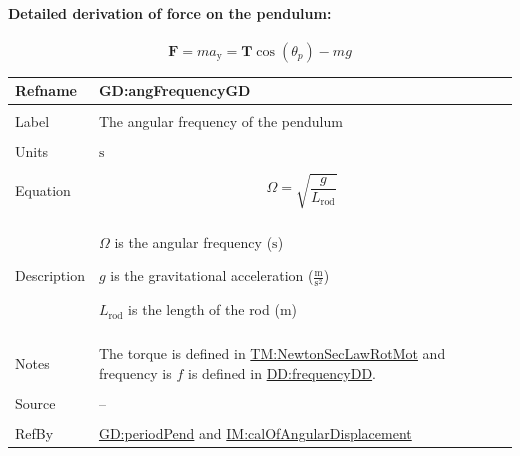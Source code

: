 \documentclass[12pt]{article}
\begin{document}
\paragraph{Detailed derivation of force on the pendulum:}
\label{GD:vForceOnPendulumDeriv}
\begin{displaymath}
\symbf{F}=m {a_{\text{y}}}=\symbf{T} \cos\left({θ_{p}}\right)-m g
\end{displaymath}
\vspace{\baselineskip}
\noindent
\begin{minipage}{\textwidth}
\begin{tabular}{>{\raggedright}p{}>{\raggedright\arraybackslash}p{}}
\toprule \textbf{Refname} & \textbf{GD:angFrequencyGD}
\label{GD:angFrequencyGD}
\\ \midrule \\
Label & The angular frequency of the pendulum
        
\\ \midrule \\
Units & ${\text{s}}$
        
\\ \midrule \\
Equation & \begin{displaymath}
           Ω=\sqrt{\frac{g}{{L_{\text{rod}}}}}
           \end{displaymath}
\\ \midrule \\
Description & \begin{symbDescription}
              \item{$Ω$ is the angular frequency (${\text{s}}$)}
              \item{$g$ is the gravitational acceleration ($\frac{\text{m}}{\text{s}^{2}}$)}
              \item{${L_{\text{rod}}}$ is the length of the rod (${\text{m}}$)}
              \end{symbDescription}
\\ \midrule \\
Notes & The torque is defined in \hyperref[TM:NewtonSecLawRotMot]{TM:NewtonSecLawRotMot} and frequency is $f$ is defined in \hyperref[DD:frequencyDD]{DD:frequencyDD}.
        
\\ \midrule \\
Source & --
         
\\ \midrule \\
RefBy & \hyperref[GD:periodPend]{GD:periodPend} and \hyperref[IM:calOfAngularDisplacement]{IM:calOfAngularDisplacement}
        
\\ \bottomrule
\end{tabular}
\end{minipage}
\end{document}
